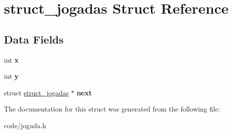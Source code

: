 \hypertarget{structstruct__jogadas}{\section{struct\+\_\+jogadas Struct Reference}
\label{structstruct__jogadas}
}
\subsection*{Data Fields}
\begin{DoxyCompactItemize}
\item 
\hypertarget{structstruct__jogadas_a6150e0515f7202e2fb518f7206ed97dc}{int {\bfseries x}}\label{structstruct__jogadas_a6150e0515f7202e2fb518f7206ed97dc}

\item 
\hypertarget{structstruct__jogadas_a0a2f84ed7838f07779ae24c5a9086d33}{int {\bfseries y}}\label{structstruct__jogadas_a0a2f84ed7838f07779ae24c5a9086d33}

\item 
\hypertarget{structstruct__jogadas_acbfb24b2c3a7f7d29678e55ccbee3948}{struct \hyperlink{structstruct__jogadas}{struct\+\_\+jogadas} $\ast$ {\bfseries next}}\label{structstruct__jogadas_acbfb24b2c3a7f7d29678e55ccbee3948}

\end{DoxyCompactItemize}


The documentation for this struct was generated from the following file\+:\begin{DoxyCompactItemize}
\item 
code/jogada.\+h\end{DoxyCompactItemize}
